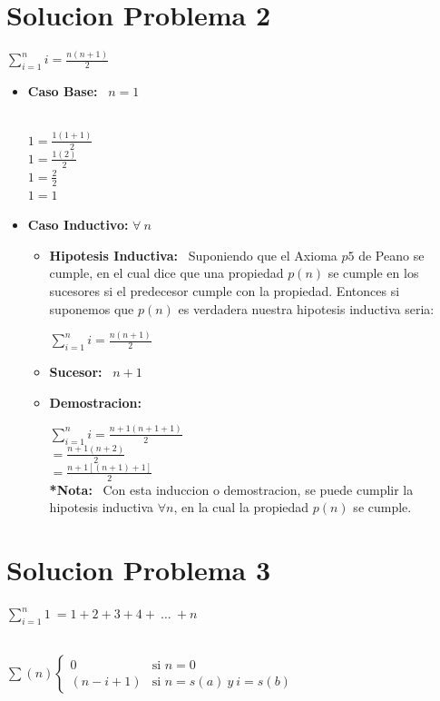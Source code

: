 \documentclass[10pt,a4paper]{article}
\begin{document}
\section*{Solucion Problema 2}
\begin{center}
$ \sum_{i=1}^{n}{i}=\frac{n(n+1)}{2} $
\end{center}
\begin{itemize}
\item \textbf{Caso Base: } \ $ n = 1 $ 
\begin{center}
\
\\ $ 1 = \frac{1(1+1)}{2} $
\
\\ $ 1 = \frac{1(2)}{2}$
\
\\ $ 1 = \frac{2}{2}$
\
\\ $ 1 = 1 $
\end{center}
\item \textbf{Caso Inductivo: } $ \forall \ n$
\begin{itemize}
\item \textbf{Hipotesis Inductiva: } \ Suponiendo que el Axioma $ p5 $ de Peano se cumple, en el cual dice que una propiedad $ p(n) $ se cumple en los sucesores si el predecesor cumple con la propiedad. Entonces si suponemos que $ p(n) $ es verdadera nuestra hipotesis inductiva seria: 
\begin{center}
$ \sum_{i=1}^{n}{i}=\frac{n(n+1)}{2} $
\end{center}
\item \textbf{Sucesor: } \ $ n+1 $
\item \textbf{Demostracion: }
\begin{center}
$ \sum_{i=1}^{n}{i}= \frac{n+1(n+1+1)}{2} $
\
\\$					= \frac{n+1(n+2)}{2} $
\
\\$					= \frac{n+1 [(n+1)+1]}{2} $
\
\\\textbf{*Nota:} \ Con esta induccion o demostracion, se puede cumplir la hipotesis inductiva $ \forall n $, en la cual la propiedad $ p(n) $ se cumple. 
\end{center}
\end{itemize}
\end{itemize}

\section*{Solucion Problema 3}
\begin{center}
$ \sum_{i=1}^{n}{1} \ =1+2+3+4+\ \ldots\ +n $

\
\\ $ \sum(n)   \left\{
                        \begin{array}{ll}
                                0  & \mbox{si } n = 0 \\
                                (n-i+1) & \mbox{si } n = s(a) \ y \ i=s(b)
                        \end{array}
                \right.
$
\end{center}
\end{document}
